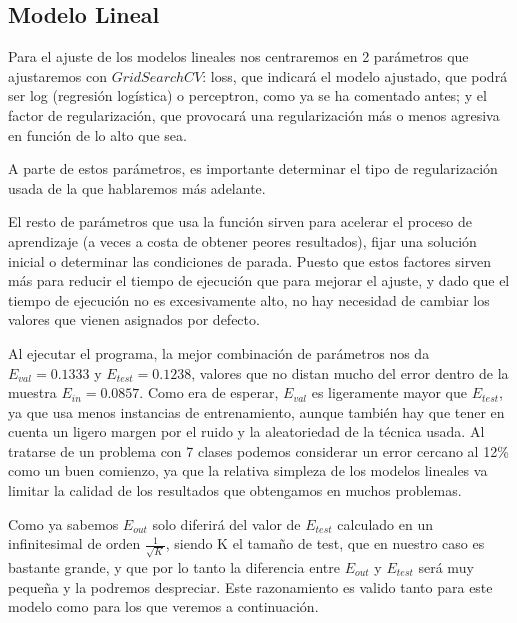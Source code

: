 \documentclass{article}
\begin{document}
	\subsection{Modelo Lineal}
	Para el ajuste de los modelos lineales nos centraremos en 2 parámetros que ajustaremos con $GridSearchCV$: loss, que indicará el modelo ajustado, que podrá ser log (regresión logística) o perceptron, como ya se ha comentado antes; y el factor de regularización, que provocará una regularización más o menos agresiva en función de lo alto que sea.
	\par 
	A parte de estos parámetros, es importante determinar el tipo de regularización usada de la que hablaremos más adelante.
	\par 
	El resto de parámetros que usa la función sirven para acelerar el proceso de aprendizaje (a veces a costa de obtener peores resultados), fijar una solución inicial o determinar las condiciones de parada. Puesto que estos factores sirven más para reducir el tiempo de ejecución que para mejorar el ajuste, y dado que el tiempo de ejecución no es excesivamente alto, no hay necesidad de cambiar los valores que vienen asignados por defecto.
	\par 
	Al ejecutar el programa, la mejor combinación de parámetros nos da  $E_{val} = 0.1333$ y $E_{test} = 0.1238$, valores que no distan mucho del error dentro de la muestra $E_{in} = 0.0857$. Como era de esperar, $E_{val}$ es ligeramente mayor que $E_{test}$, ya que usa menos instancias de entrenamiento, aunque también hay que tener en cuenta un ligero margen por el ruido y la aleatoriedad de la técnica usada. Al tratarse de un problema con 7 clases podemos considerar un error cercano al 12\% como un buen comienzo, ya que la relativa simpleza de los modelos lineales va limitar la calidad de los resultados que obtengamos en muchos problemas.
	  \par 
	Como ya sabemos $E_{out}$ solo diferirá del valor de $E_{test}$ calculado en un infinitesimal de orden $\frac{1}{\sqrt{K}}$, siendo K el tamaño de test, que en nuestro caso es bastante grande, y que por lo tanto la diferencia entre $E_{out}$ y $E_{test}$ será muy pequeña y la podremos despreciar. Este razonamiento es valido tanto para este modelo como para los que veremos a continuación.
	
\end{document}
